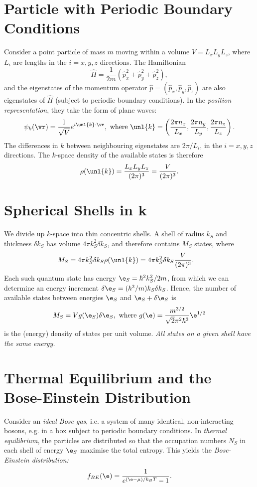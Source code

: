 \documentclass[qo.tex]{subfiles}
\begin{document}
\section{Particle with Periodic Boundary Conditions}
Consider a point particle of mass $m$ moving within a volume $V=L_xL_yL_z$, where $L_i$ are lengths in the $i=x,y,z$ directions. 
The Hamiltonian 
\begin{equation}
    \hat{H} = \frac{1}{2m}\left(\hat{p}_x^2+\hat{p}_y^2+\hat{p}_z^2\right),
\end{equation}
and the eigenstates of the momentum operator $\hat{p}=(\hat{p}_x,\hat{p}_y,\hat{p}_z)$ are also eigenstates of $\hat{H}$ (subject to periodic boundary conditions).
In the \emph{position representation}, they take the form of plane waves:
\begin{align}
    \psi_k(\vr) = \frac{1}{\sqrt{V}}e^{i\unl{k}\cdot\vr}, \text{ where } \unl{k} = \left(\frac{2\pi n_x}{L_x},\frac{2\pi n_y}{L_y},\frac{2\pi n_z}{L_z}\right).
\end{align}
The differences in $k$ between neighbouring eigenstates are $2\pi/L_i$, in the $i=x,y,z$ directions.
The $k$-space density of the available states is therefore
\begin{align}
    \rho(\unl{k}) = \frac{L_xL_yL_z}{(2\pi)^3} = \frac{V}{(2\pi)^3}.
\end{align}

\section{Spherical Shells in k}
We divide up $k$-space into thin concentric shells. 
A shell of radius $k_S$ and thickness $\delta k_S$ has volume $4\pi k_S^2\delta k_S$, and therefore contains $M_S$ states, where
\begin{align}
    M_S &= 4\pi k_S^2\delta k_S\rho(\unl{k}) = 4\pi k_S^2\delta k_S \frac{V}{(2\pi)^3}.
\end{align}
Each such quantum state has energy $\e_S=\hbar^2k_S^2/2m$, from which we can determine an energy increment $\delta\e_S=(\hbar^2/m)k_S\delta k_S$.
Hence, the number of available states between energies $\e_S$ and $\e_S+\delta\e_S$ is
\begin{align}
    M_S = Vg(\e_S)\delta\e_S, \text{ where } g(\e) = \frac{m^{3/2}}{\sqrt{2}\pi^2\hbar^3}\e^{1/2}
\end{align}
is the (energy) density of states per unit volume. 
\emph{All states on a given shell have the same energy.}

\section{Thermal Equilibrium and the Bose-Einstein Distribution}
Consider an \emph{ideal Bose gas}, i.e. a system of many identical, non-interacting bosons, e.g. in a box subject to periodic boundary conditions. 
In \emph{thermal equilibrium}, the particles are distributed so that the occupation numbers $N_S$ in each shell of energy $\e_S$ maximise the total entropy. 
This yields the \emph{Bose-Einstein distribution:}
\begin{align}
    f_{BE}(\e) = \frac{1}{e^{(\e-\mu)/k_BT}-1}.
\end{align}
\end{document}
